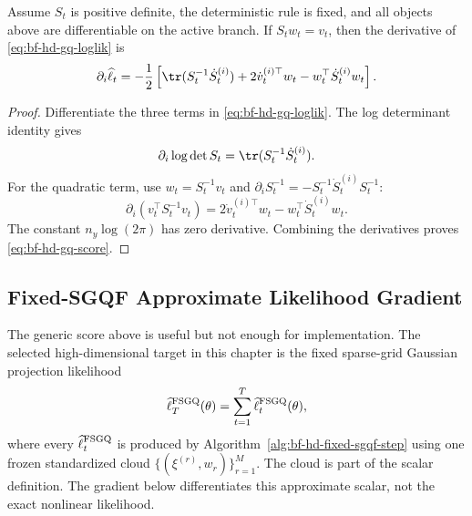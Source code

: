 \begin{proposition}
\label{prop:bf-hd-gq-score}
Assume \(S_t\) is positive definite, the deterministic rule is fixed, and all
objects above are differentiable on the active branch.  If \(S_tw_t=v_t\), then
the derivative of \eqref{eq:bf-hd-gq-loglik} is
\begin{equation}
  \partial_i\widehat\ell_t
  =
  -\frac12
  \left[
    \tr(S_t^{-1}\dot S_t^{(i)})
    +2\dot v_t^{(i)\top}w_t
    -w_t^\top\dot S_t^{(i)}w_t
  \right].
  \label{eq:bf-hd-gq-score}
\end{equation}
\end{proposition}

\begin{proof}
Differentiate the three terms in \eqref{eq:bf-hd-gq-loglik}.  The log
determinant identity gives
\[
  \partial_i\log\det S_t=\tr(S_t^{-1}\dot S_t^{(i)}).
\]
For the quadratic term, use \(w_t=S_t^{-1}v_t\) and
\(\partial_i S_t^{-1}=-S_t^{-1}\dot S_t^{(i)}S_t^{-1}\):
\[
  \partial_i(v_t^\top S_t^{-1}v_t)
  =
  2\dot v_t^{(i)\top}w_t
  -w_t^\top\dot S_t^{(i)}w_t.
\]
The constant \(n_y\log(2\pi)\) has zero derivative.  Combining the derivatives
proves \eqref{eq:bf-hd-gq-score}.
\end{proof}

\subsection{Fixed-SGQF Approximate Likelihood Gradient}
\label{sec:bf-hd-fixed-sgqf-gradient}

The generic score above is useful but not enough for implementation.  The
selected high-dimensional target in this chapter is the fixed sparse-grid
Gaussian projection likelihood
\begin{equation}
  \widehat\ell_T^{\rm FSGQ}(\theta)
  =
  \sum_{t=1}^T\widehat\ell_t^{\rm FSGQ}(\theta),
  \label{eq:bf-hd-fsgq-total-likelihood}
\end{equation}
where every \(\widehat\ell_t^{\rm FSGQ}\) is produced by
Algorithm~\ref{alg:bf-hd-fixed-sgqf-step} using one frozen standardized cloud
\(\{(\xi^{(r)},w_r)\}_{r=1}^M\).  The cloud is part of the scalar definition.
The gradient below differentiates this approximate scalar, not the exact
nonlinear likelihood.

